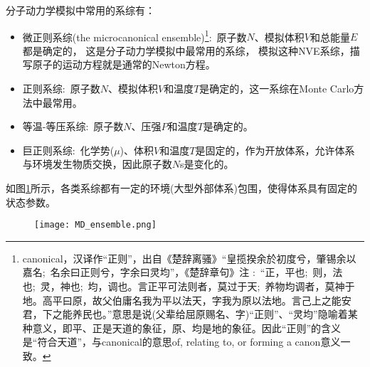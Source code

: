 分子动力学模拟中常用的系综有：
\begin{itemize}
	\item 微正则系综\textrm{(the microcanonical ensemble)}\footnote{\textrm{canonical}，汉译作``正则''，出自《楚辞\textperiodcentered 离骚》``皇揽揆余於初度兮，肇锡余以嘉名;~名余曰正则兮，字余曰灵均''，《楚辞章句》注%
:~``正，平也;~则，法也;~灵，神也;~均，调也。言正平可法则者，莫过于天;~养物均调者，莫神于地。高平曰原，故父伯庸名我为平以法天，字我为原以法地。言己上之能安君，下之能养民也。''意思是说(父辈给屈原赐名、字)``正则''、``灵均''隐喻着某种意义，即平、正是天道的象征，原、均是地的象征。因此``正则''的含义是``符合天道''，与\textrm{canonical}的意思\textrm{of, relating to, or forming a canon}意义一致。}:~原子数$N$、模拟体积$V$和总能量$E$都是确定的，%
这是分子动力学模拟中最常用的系综，%
模拟这种\textrm{NVE}系综，描写原子的运动方程就是通常的\textrm{Newton}方程。
\item 正则系综:~原子数$N$、模拟体积$V$和温度$T$是确定的，这一系综在\textrm{Monte Carlo}方法中最常用。
\item 等温-等压系综:~原子数$N$、压强$P$和温度$T$是确定的。
\item 巨正则系综:~化学势($\mu$)、体积$V$和温度$T$是固定的，作为开放体系，允许体系与环境发生物质交换，因此原子数$N$s是变化的。
\end{itemize}
如图\ref{MD_ensemble}所示，各类系综都有一定的环境(大型外部体系)包围，使得体系具有固定的状态参数。
\begin{figure}[h!]
\centering
\vspace*{-0.1in}
\texttt{[image: MD\_ensemble.png]}
\caption{\fontsize{7.2pt}{4.2pt}}%
\label{MD_ensemble}
\end{figure}

